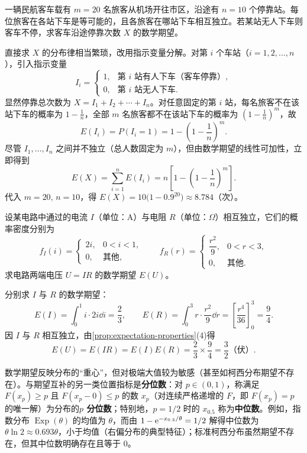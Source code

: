 \begin{example}[title={公交车停靠次数（指示变量法）}]
\label{eg:bus-stops}
一辆民航客车载有 $m=20$ 名旅客从机场开往市区，沿途有 $n=10$ 个停靠站。每位旅客在各站下车是等可能的，且各旅客在哪站下车相互独立。若某站无人下车则客车不停，求客车沿途停靠次数 $X$ 的数学期望。
\begin{solution}
直接求 $X$ 的分布律相当繁琐，改用指示变量分解。对第 $i$ 个车站（$i=1,2,\ldots,n$），引入指示变量
\[
  I_i=
  \begin{cases}
    1,& \text{第 }i\text{ 站有人下车（客车停靠）},\\
    0,& \text{第 }i\text{ 站无人下车}.
  \end{cases}
\]
显然停靠总次数为 $X=I_1+I_2+\cdots+I_n$。对任意固定的第 $i$ 站，每名旅客不在该站下车的概率为 $1-\frac{1}{n}$，全部 $m$ 名旅客都不在该站下车的概率为 $\left(1-\frac{1}{n}\right)^m$，故
\[
  E(I_i)=P(I_i=1)=1-\left(1-\frac{1}{n}\right)^m.
\]
尽管 $I_1,\ldots,I_n$ 之间并不独立（总人数固定为 $m$），但由数学期望的线性可加性，立即得到
\[
  E(X)=\sum_{i=1}^{n}E(I_i)=n\left[1-\left(1-\frac{1}{n}\right)^m\right].
\]
代入 $m=20,\,n=10$，得 $E(X)=10\bigl(1-0.9^{20}\bigr)\approx 8.784$（次）。
\end{solution}
\end{example}

\begin{example}[title={独立电流与电阻下的电压数学期望}]
\label{eg:voltage-expectation}
设某电路中通过的电流 $I$（单位：$\mathrm{A}$）与电阻 $R$（单位：$\Omega$）相互独立，它们的概率密度分别为
\[
  f_I(i)=
  \begin{cases}
    2i,& 0<i<1,\\
    0,& \text{其他},
  \end{cases}
  \qquad
  f_R(r)=
  \begin{cases}
    \dfrac{r^2}{9},& 0<r<3,\\
    0,& \text{其他}.
  \end{cases}
\]
求电路两端电压 $U=IR$ 的数学期望 $E(U)$。
\begin{solution}
分别求 $I$ 与 $R$ 的数学期望：
\[
  E(I)=\int_{0}^{1}i\cdot 2i\dd i=\frac{2}{3},\qquad
  E(R)=\int_{0}^{3}r\cdot\frac{r^2}{9}\dd r=\left[\frac{r^4}{36}\right]_{0}^{3}=\frac{9}{4}.
\]
因 $I$ 与 $R$ 相互独立，由\cref{prop:expectation-properties}(4)得
\[
  E(U)=E(IR)=E(I)E(R)=\frac{2}{3}\times\frac{9}{4}=\frac{3}{2}\text{（伏）}.
\]
\end{solution}
\end{example}

\begin{remark}[分位数与中位数]
数学期望反映分布的“重心”，但对极端大值较为敏感（甚至如柯西分布期望不存在）。与期望互补的另一类位置指标是\textbf{分位数}：对 $p\in(0,1)$，称满足 $F(x_p)\ge p$ 且 $F(x_p-0)\le p$ 的数 $x_p$（对连续严格递增的 $F$，即 $F(x_p)=p$ 的唯一解）为分布的\textbf{$p$ 分位数}；特别地，$p=1/2$ 时的 $x_{0.5}$ 称为\textbf{中位数}。例如，指数分布 $\operatorname{Exp}(\theta)$ 的均值为 $\theta$，而由 $1-\mathrm{e}^{-x_{0.5}/\theta}=1/2$ 解得中位数为 $\theta\ln 2\approx 0.693\theta$，小于均值（右偏分布的典型特征）；标准柯西分布虽然期望不存在，但其中位数明确存在且等于 $0$。
\end{remark}

